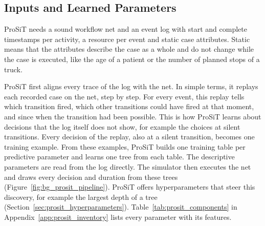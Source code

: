 \subsection{Inputs and Learned Parameters}
\label{sec:prosit_components}

ProSiT needs a sound workflow net and an event log with start and complete
timestamps per activity, a resource per event and static case attributes. Static
means that the attributes describe the case as a whole and do not change while
the case is executed, like the age of a patient or the number of planned stops
of a truck.

ProSiT first aligns every trace of the log with the net. In simple terms, it
replays each recorded case on the net, step by step. For every event, this
replay tells which transition fired, which other transitions could have fired at
that moment, and since when the transition had been possible. This is how
ProSiT learns about decisions that the log itself does not show, for example
the choices at silent transitions. Every decision of the replay, also at a
silent transition, becomes one training example. From these examples, ProSiT
builds one training table per predictive parameter and learns one tree from each
table. The descriptive parameters are read from the log directly.
The simulator then executes the net and draws every decision and duration from
these trees (Figure~\ref{fig:bg_prosit_pipeline}). ProSiT offers hyperparameters
that steer this discovery, for example the largest depth of a tree
(Section~\ref{sec:prosit_hyperparameters}).
Table~\ref{tab:prosit_components} in Appendix~\ref{app:prosit_inventory} lists
every parameter with its features.


